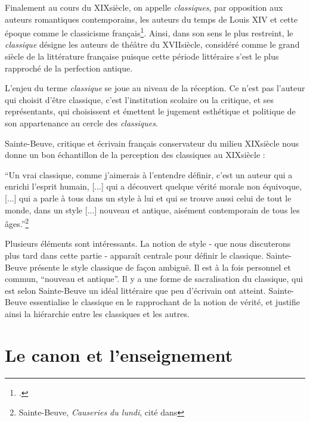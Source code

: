 Finalement au cours du XIX\ieme siècle, on appelle \textit{classiques}, par opposition aux auteurs romantiques contemporains, les auteurs du temps de Louis XIV et cette époque comme le classicisme français\footcites{viala_quest-ce_1993}. Ainsi, dans son sens le plus restreint, le \textit{classique} désigne les auteurs de théâtre du XVII\ieme siècle, considéré comme le grand siècle de la littérature française puisque cette période littéraire s'est le plus rapproché de la perfection antique.

L'enjeu du terme \textit{classique} se joue au niveau de la réception. Ce n'est pas l'auteur qui choisit d'être classique, c'est l'institution scolaire ou la critique, et ses représentants, qui choisissent et émettent le jugement esthétique et politique de son appartenance au cercle des \textit{classiques}.

Sainte-Beuve, critique et écrivain français conservateur du milieu XIX\ieme siècle nous donne un bon échantillon de la perception des classiques au XIX\ieme siècle :
\begin{displayquote} \enquote{Un vrai classique, comme j'aimerais à l'entendre définir, c'est un auteur qui a enrichi l'esprit humain, [...] qui a découvert quelque vérité morale non équivoque, [...] qui a parle à tous dans un style à lui et qui se trouve aussi celui de tout le monde, dans un style [...] nouveau et antique, aisément contemporain de tous les âges.}\footnote{Sainte-Beuve, \textit{Causeries du lundi}, cité dans\cite{compagnon_sainte-beuve_1995}}
\end{displayquote}
Plusieurs éléments sont intéressants. La notion de style - que nous discuterons plus tard dans cette partie - apparaît centrale pour définir le classique. Sainte-Beuve présente le style classique de façon ambiguë. Il est à la fois personnel et commun, \enquote{nouveau et antique}. Il y a une forme de sacralisation du classique, qui est selon Sainte-Beuve un idéal littéraire que peu d'écrivain ont atteint. Sainte-Beuve essentialise le classique en le rapprochant de la notion de vérité, et justifie ainsi la hiérarchie entre les classiques et les autres.


\section{Le canon et l'enseignement}

